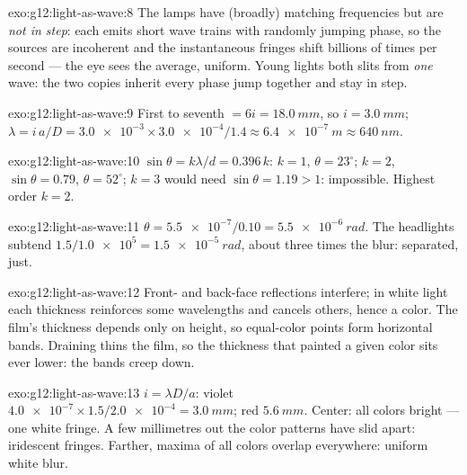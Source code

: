 \begin{solution}{exo:g12:light-as-wave:8}
The lamps have (broadly) matching frequencies but are \emph{not in
step}: each emits short wave trains with randomly jumping phase, so
the sources are incoherent and the instantaneous fringes shift
billions of times per second --- the eye sees the average, uniform.
Young lights both slits from \emph{one} wave: the two copies inherit
every phase jump together and stay in step.
\end{solution}

\begin{solution}{exo:g12:light-as-wave:9}
First to seventh $= 6i = \qty{18.0}{mm}$, so $i = \qty{3.0}{mm}$;
$\lambda = i\,a/D = \num{3.0e-3} \times \num{3.0e-4}/1.4 \approx
\qty{6.4e-7}{m} \approx \qty{640}{nm}$.
\end{solution}

\begin{solution}{exo:g12:light-as-wave:10}
$\sin\theta = k\lambda/d = 0.396\,k$: $k = 1$, $\theta = 23^\circ$;
$k = 2$, $\sin\theta = 0.79$, $\theta = 52^\circ$; $k = 3$ would need
$\sin\theta = 1.19 > 1$: impossible. Highest order $k = 2$.
\end{solution}

\begin{solution}{exo:g12:light-as-wave:11}
$\theta = \num{5.5e-7}/0.10 = \qty{5.5e-6}{rad}$. The headlights
subtend $1.5/\num{1.0e5} = \qty{1.5e-5}{rad}$, about three times the
blur: separated, just.
\end{solution}

\begin{solution}{exo:g12:light-as-wave:12}
Front- and back-face reflections interfere; in white light each
thickness reinforces some wavelengths and cancels others, hence a
color. The film's thickness depends only on height, so equal-color
points form horizontal bands. Draining thins the film, so the
thickness that painted a given color sits ever lower: the bands
creep down.
\end{solution}

\begin{solution}{exo:g12:light-as-wave:13}
$i = \lambda D/a$: violet $\num{4.0e-7} \times 1.5/\num{2.0e-4} =
\qty{3.0}{mm}$; red $\qty{5.6}{mm}$. Center: all colors bright ---
one white fringe. A few millimetres out the color patterns have
slid apart: iridescent fringes. Farther, maxima of all colors
overlap everywhere: uniform white blur.
\end{solution}

